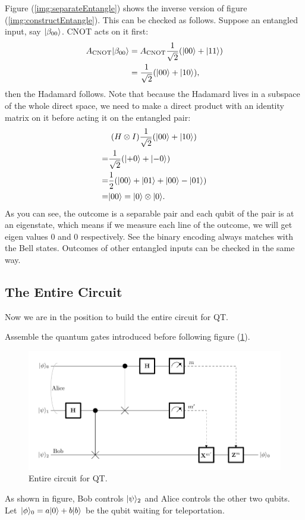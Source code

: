 		Figure (\ref{img:separateEntangle}) shows the inverse version of figure (\ref{img:constructEntangle}). This can be checked as follows. Suppose an entangled input, say
		 $|{\beta_{00}} \rangle$. CNOT acts on it first:
		\begin{equation}
		\begin{split}
			A_{\text{CNOT}} |{\beta_{00}} \rangle &= A_{\text{CNOT}} \frac{1}{\sqrt{2}} (|{00} \rangle+|{11} \rangle)\\
			&=\frac{1}{\sqrt{2}} (|{00} \rangle+|{10} \rangle),
		\end{split}
		\end{equation}
		then the Hadamard follows. Note that because the Hadamard lives in a subspace of the whole direct space, we need to make a direct product with an identity matrix on it before acting it on the entangled pair:
		\begin{equation} 
		\begin{split}
			&\ (H\otimes I) \frac{1}{\sqrt{2}} (|{00} \rangle+|{10} \rangle)\\
			=& \frac{1}{\sqrt{2}} (|{+0} \rangle+|{-0} \rangle)\\
			=&\frac{1}{2}(|{00} \rangle+|{01} \rangle+|{00} \rangle-|{01} \rangle)\\
			=&|{00} \rangle = |{0} \rangle\otimes|{0} \rangle.
		\end{split}
		\end{equation}
		As you can see, the outcome is a separable pair and each qubit of the pair is at
		an eigenstate, which means if we measure each line of the outcome, we will get
		eigen values $0$ and $0$ respectively. 
		See the binary encoding always matches with the Bell states. Outcomes of other entangled inputs can be checked in the same way.

	\subsection{The Entire Circuit}
		Now we are in the position to build the entire circuit for QT. 

		Assemble the quantum gates introduced before following figure 
		(\ref{img:entireCircuit}). 
		\begin{figure}
		\centering
		\includegraphics[scale=0.6]{img/EntireCircuit-1.pdf}
		\caption{Entire circuit for QT.}
		\label{img:entireCircuit}
		\end{figure}
		As shown in figure, Bob controls $|{\psi} \rangle_2$ and Alice controls the other two
		qubits. Let $|{\phi} \rangle_0 = a|{0} \rangle+b|{b} \rangle$ be the qubit 
		waiting for teleportation.


